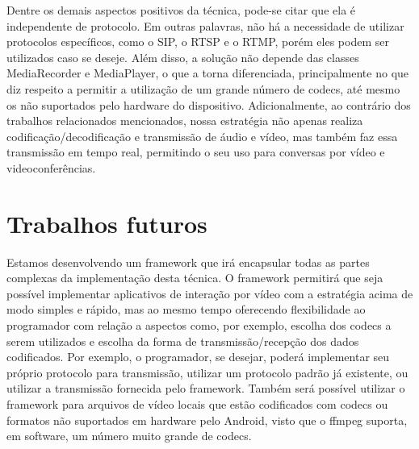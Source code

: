 \documentclass{acm_proc_article-sp}
\begin{document}
Dentre os demais aspectos positivos da técnica, pode-se citar que ela é independente de protocolo. Em outras palavras, não há a necessidade de utilizar protocolos específicos, como o SIP, o RTSP e o RTMP, porém eles podem ser utilizados caso se deseje. Além disso, a solução não depende das classes MediaRecorder e MediaPlayer, o que a torna diferenciada, principalmente no que diz respeito a permitir a utilização de um grande número de codecs, até mesmo os não suportados pelo hardware do dispositivo. Adicionalmente, ao contrário dos trabalhos relacionados mencionados, nossa estratégia não apenas realiza codificação/decodificação e transmissão de áudio e vídeo, mas também faz essa transmissão em tempo real, permitindo o seu uso para conversas por vídeo e videoconferências.

\section{Trabalhos futuros}

Estamos desenvolvendo um framework que irá encapsular todas as partes complexas da implementação desta técnica. O framework permitirá que seja possível implementar aplicativos de interação por vídeo com a estratégia acima de modo simples e rápido, mas ao mesmo tempo oferecendo flexibilidade ao programador com relação a aspectos como, por exemplo, escolha dos codecs a serem utilizados e escolha da forma de transmissão/recepção dos dados codificados. Por exemplo, o programador, se desejar, poderá implementar seu próprio protocolo para transmissão, utilizar um protocolo padrão já existente, ou utilizar a transmissão fornecida pelo framework. Também será possível utilizar o framework para arquivos de vídeo locais que estão codificados com codecs ou formatos não suportados em hardware pelo Android, visto que o ffmpeg suporta, em software, um número muito grande de codecs.

%

%
%
\balancecolumns
\end{document}
